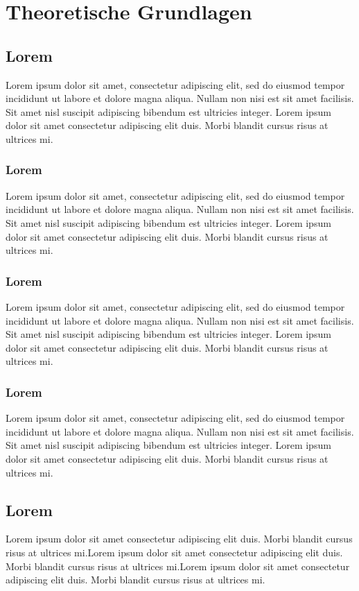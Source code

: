 \fancyhead[L]{\nouppercase{}} 
\section{Theoretische Grundlagen}\label{theoretische_grundlagen}
\subsection{Lorem}
Lorem ipsum dolor sit amet, consectetur adipiscing elit, sed do eiusmod tempor incididunt ut labore et dolore magna aliqua. Nullam non nisi est sit amet facilisis. Sit amet nisl suscipit adipiscing bibendum est ultricies integer. Lorem ipsum dolor sit amet consectetur adipiscing elit duis. Morbi blandit cursus risus at ultrices mi. 
\subsubsection{Lorem}
Lorem ipsum dolor sit amet, consectetur adipiscing elit, sed do eiusmod tempor incididunt ut labore et dolore magna aliqua. Nullam non nisi est sit amet facilisis. Sit amet nisl suscipit adipiscing bibendum est ultricies integer. Lorem ipsum dolor sit amet consectetur adipiscing elit duis. Morbi blandit cursus risus at ultrices mi. 
\subsubsection{Lorem}
Lorem ipsum dolor sit amet, consectetur adipiscing elit, sed do eiusmod tempor incididunt ut labore et dolore magna aliqua. Nullam non nisi est sit amet facilisis. Sit amet nisl suscipit adipiscing bibendum est ultricies integer. Lorem ipsum dolor sit amet consectetur adipiscing elit duis. Morbi blandit cursus risus at ultrices mi.
\newpage
\fancyhead[L]{\nouppercase{\leftmark}} 
\subsubsection{Lorem}
Lorem ipsum dolor sit amet, consectetur adipiscing elit, sed do eiusmod tempor incididunt ut labore et dolore magna aliqua. Nullam non nisi est sit amet facilisis. Sit amet nisl suscipit adipiscing bibendum est ultricies integer. Lorem ipsum dolor sit amet consectetur adipiscing elit duis. Morbi blandit cursus risus at ultrices mi. 
\subsection{Lorem}
Lorem ipsum dolor sit amet consectetur adipiscing elit duis. Morbi blandit cursus risus at ultrices mi.Lorem ipsum dolor sit amet consectetur adipiscing elit duis. Morbi blandit cursus risus at ultrices mi.Lorem ipsum dolor sit amet consectetur adipiscing elit duis. Morbi blandit cursus risus at ultrices mi.

